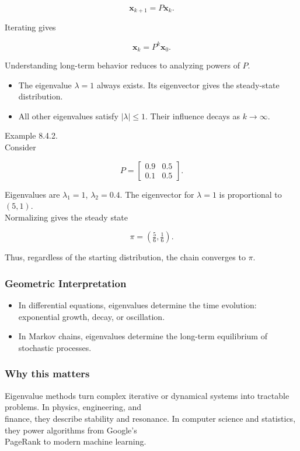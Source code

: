 \documentclass[
  12pt,
  a4paper,
]{article}
\begin{document}
\[\mathbf{x}_{k+1} = P \mathbf{x}_k.\]

Iterating gives

\[\mathbf{x}_k = P^k \mathbf{x}_0.\]

Understanding long-term behavior reduces to analyzing powers of \(P\).

\begin{itemize}
\item
  The eigenvalue \(\lambda = 1\) always exists. Its eigenvector gives
  the steady-state distribution.
\item
  All other eigenvalues satisfy \(|\lambda| \leq 1\). Their influence
  decays as \(k \to \infty\).
\end{itemize}

Example 8.4.2.\\
Consider

\[P = \begin{bmatrix}
0.9 & 0.5 \\
0.1 & 0.5 \end{bmatrix}.\]

Eigenvalues are \(\lambda_1 = 1\), \(\lambda_2 = 0.4\). The eigenvector
for \(\lambda = 1\) is proportional to \((5,1)\).\\
Normalizing gives the steady state

\[\pi = \left(\tfrac{5}{6}, \tfrac{1}{6}\right).\]

Thus, regardless of the starting distribution, the chain converges to
\(\pi\).

\subsubsection{Geometric
Interpretation}\label{geometric-interpretation-19}

\begin{itemize}
\item
  In differential equations, eigenvalues determine the time evolution:
  exponential growth, decay, or oscillation.
\item
  In Markov chains, eigenvalues determine the long-term equilibrium of
  stochastic processes.
\end{itemize}

\subsubsection{Why this matters}\label{why-this-matters-31}

Eigenvalue methods turn complex iterative or dynamical systems into
tractable problems. In physics, engineering, and\\
finance, they describe stability and resonance. In computer science and
statistics, they power algorithms from Google's\\
PageRank to modern machine learning.
\end{document}
